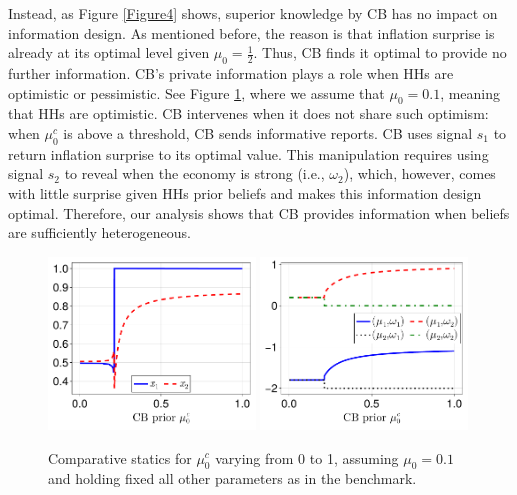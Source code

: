 \documentclass[12pt,a4paper]{article}
\begin{document}
Instead, as Figure \ref{Figure4} shows, superior knowledge by CB has no impact on information design. As mentioned before, the reason is that inflation surprise is already at its optimal level given $\mu_0=\frac{1}{2}$. Thus, CB finds it optimal to provide no further information. CB's private information plays a role when HHs are optimistic or pessimistic. See Figure \ref{Figure4new}, where we assume that $\mu_0 = 0.1$, meaning that HHs are optimistic. CB intervenes when it does not share such optimism: when $\mu_0^c$ is above a threshold, CB sends informative reports. CB uses signal $s_1$ to return inflation surprise to its optimal value. This manipulation requires using signal $s_2$ to reveal when the economy is strong (i.e., $\omega_2$), which, however, comes with little surprise given HHs prior beliefs and makes this information design optimal. Therefore, our analysis shows that CB provides information when beliefs are sufficiently heterogeneous. 

 \begin{figure}[htp!]
    \centering
    \includegraphics[width=0.49\textwidth]{figures/V11/γ=1.0-μ_0=0.1-α=1.0-θ=1.0/communication/fig_optimal_x_by_μ_0_c.pdf}
    \includegraphics[width=0.49\textwidth]{figures/V11/γ=1.0-μ_0=0.1-α=1.0-θ=1.0/communication/fig_optimal_γ_by_μ_0_c.pdf}
    \caption{Comparative statics for $\mu_0^c$ varying from 0 to 1, assuming $\mu_0=0.1$ and holding fixed all other parameters as in the benchmark.}
    \label{Figure4new}
\end{figure}
\end{document}

